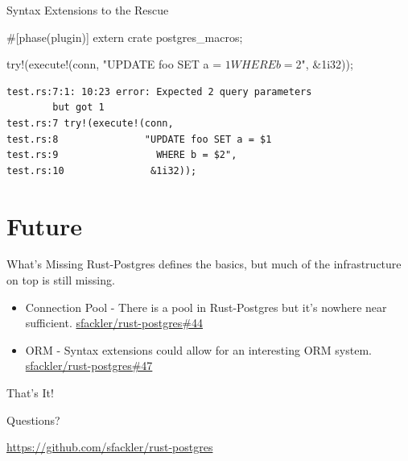 \documentclass{beamer}
\begin{document}
\begin{frame}[fragile]{Syntax Extensions to the Rescue}
    \begin{rustcode}
#[phase(plugin)]
extern crate postgres_macros;

try!(execute!(conn,
              "UPDATE foo SET a = $1
                WHERE b = $2",
              &1i32));
    \end{rustcode}
    \begin{verbatim}
test.rs:7:1: 10:23 error: Expected 2 query parameters
        but got 1
test.rs:7 try!(execute!(conn,
test.rs:8               "UPDATE foo SET a = $1
test.rs:9                 WHERE b = $2",
test.rs:10               &1i32));
    \end{verbatim}
\end{frame}

\section{Future}

\begin{frame}{What's Missing}
    Rust-Postgres defines the basics, but much of the infrastructure on top
    is still missing.
    \begin{itemize}
        \item Connection Pool - There is a pool in Rust-Postgres but it's nowhere near sufficient. \href{https://github.com/sfackler/rust-postgres/issues/44}{sfackler/rust-postgres\#44}
        \item ORM - Syntax extensions could allow for an interesting ORM system. \href{https://github.com/sfackler/rust-postgres/issues/47}{sfackler/rust-postgres\#47}
    \end{itemize}
\end{frame}

\begin{frame}{That's It!}
    \begin{center}
        Questions?

        \vspace{10mm}

        \url{https://github.com/sfackler/rust-postgres}
    \end{center}
\end{frame}
\end{document}
